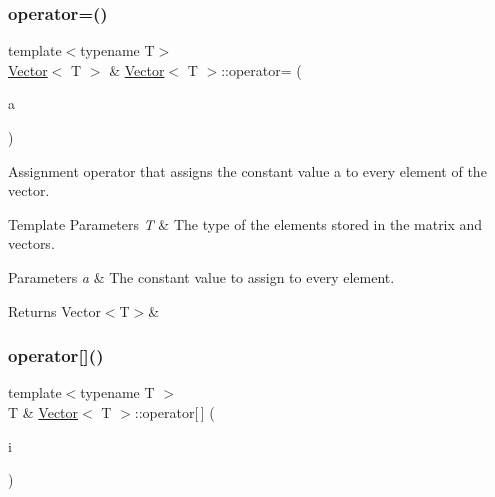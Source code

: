 \subsubsection{\texorpdfstring{operator=()}{operator=()}\hspace{0.1cm}{\footnotesize\ttfamily [2/2]}}
{\footnotesize\ttfamily template$<$typename T$>$ \\
\mbox{\hyperlink{classVector}{Vector}}$<$ T $>$ \& \mbox{\hyperlink{classVector}{Vector}}$<$ T $>$\+::operator= (\begin{DoxyParamCaption}\item[{const T \&}]{a }\end{DoxyParamCaption})\hspace{0.3cm}{\ttfamily [inline]}}



Assignment operator that assigns the constant value {\ttfamily a} to every element of the vector. 


\begin{DoxyTemplParams}{Template Parameters}
{\em T} & The type of the elements stored in the matrix and vectors. \\
\hline
\end{DoxyTemplParams}

\begin{DoxyParams}{Parameters}
{\em a} & The constant value to assign to every element. \\
\hline
\end{DoxyParams}
\begin{DoxyReturn}{Returns}
Vector$<$\+T$>$\& 
\end{DoxyReturn}
\mbox{\label{classVector_aa07a0c8ca467e2ce190afc26054cf422}} 
\subsubsection{\texorpdfstring{operator[]()}{operator[]()}\hspace{0.1cm}{\footnotesize\ttfamily [1/2]}}
{\footnotesize\ttfamily template$<$typename T $>$ \\
T \& \mbox{\hyperlink{classVector}{Vector}}$<$ T $>$\+::operator\mbox{[}$\,$\mbox{]} (\begin{DoxyParamCaption}\item[{const unsigned int \&}]{i }\end{DoxyParamCaption})\hspace{0.3cm}{\ttfamily [inline]}}




